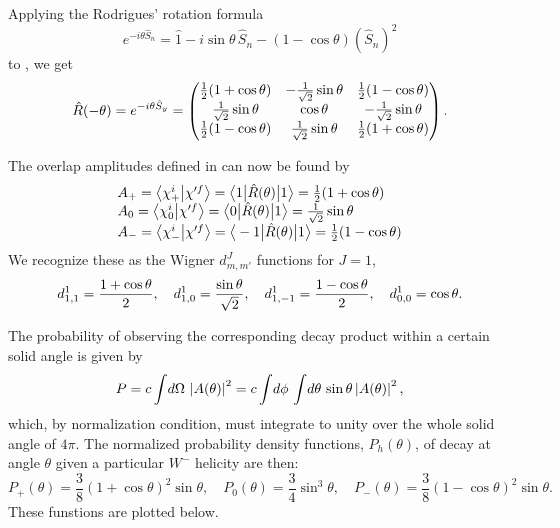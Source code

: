 \documentclass[12pt]{article}
\begin{document}
Applying the Rodrigues' rotation formula
\begin{equation}
  e^{-i\theta\hat{S}_n} = \hat{1} - i\sin\theta\,\hat{S}_n - (1-\cos\theta)(\hat{S}_n)^2
\end{equation}
to , we get
\begin{equation}
  \hat{R}(-\theta) = e^{-i\theta \hat{S}_y}
  = \begin{pmatrix}
    \half(1+\cos\theta) & -\frac{1}{\sqrt{2}}\sin\theta & \half(1-\cos\theta) \\
    \frac{1}{\sqrt{2}}\sin\theta & \cos\theta & -\frac{1}{\sqrt{2}}\sin\theta \\
    \half(1-\cos\theta) & \frac{1}{\sqrt{2}}\sin\theta & \half(1+\cos\theta) \\
  \end{pmatrix}.
\end{equation}

The overlap amplitudes defined in  can now be found by
\begin{equation}\label{eq:overlap_found}
  \begin{array}{l}
    A_+ = \bracket{\chi^i_+}{\chi'^f}
    = \bra{1}\hat{R}(\theta)\ket{1}
    = \half(1+\cos\theta) \\
    A_0 = \bracket{\chi^i_0}{\chi'^f}
    = \bra{0}\hat{R}(\theta)\ket{1}
    = \frac{1}{\sqrt{2}}\sin\theta \\
    A_- = \bracket{\chi^i_-}{\chi'^f}
    = \bra{-1}\hat{R}(\theta)\ket{1}
    = \half(1-\cos\theta)
  \end{array}
\end{equation}
%
We recognize these as the Wigner $d^J_{m,m'}$ functions for $J=1$,
\begin{equation}
  d^1_{1, 1} = \half[1+\cos\theta], \quad
  d^1_{1, 0} = \frac{\sin\theta}{\sqrt{2}}, \quad
  d^1_{1,-1} = \half[1-\cos\theta], \quad
  d^1_{0, 0} = \cos\theta.
\end{equation}

The probability of observing the corresponding decay product within a certain solid angle is given by
\begin{equation}\label{eq:angle_prob}
  P = c\int\! d\Omega\, \normsq{A(\theta)} = c\int\! d\phi\, \int\! d\theta\, \sin\theta \normsq{A(\theta)},
\end{equation}
which, by normalization condition, must integrate to unity over the whole solid angle of $4\pi$. The normalized probability density functions, $P_h(\theta)$, of decay at angle $\theta$ given a particular $W^-$ helicity are then:
\begin{equation}
  P_+(\theta) = \frac{3}{8}(1+\cos\theta)^2\sin\theta, \quad
  P_0(\theta) = \frac{3}{4}\sin^3\theta, \quad
  P_-(\theta) = \frac{3}{8}(1-\cos\theta)^2\sin\theta.
\end{equation}
%
These funstions are plotted below.
\end{document}
